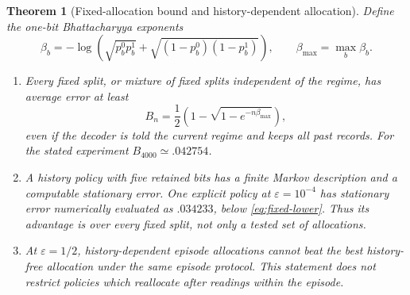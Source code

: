 \documentclass[12pt,a4paper]{article}
\newtheorem{theorem}{Theorem}[section]
\begin{document}
\begin{theorem}[Fixed-allocation bound and history-dependent allocation]
\label{thm:history-allocation}
Define the one-bit Bhattacharyya exponents
\[
 \beta_b=-\log\left(\sqrt{p_b^0p_b^1}
                  +\sqrt{(1-p_b^0)(1-p_b^1)}\right),\qquad
 \beta_{\max}=\max_b\beta_b.
\]
\begin{enumerate}
\item Every fixed split, or mixture of fixed splits independent of
the regime, has average error at least
\begin{equation}\label{eq:fixed-lower}
 B_n=\frac12\left(1-\sqrt{1-e^{-n\beta_{\max}}}\right),
\end{equation}
even if the decoder is told the current regime and keeps all past
records. For the stated experiment $B_{4000}\simeq .042754$.
\item A history policy with five retained bits has a finite Markov
description and a computable stationary error. One explicit policy
at $\varepsilon=10^{-4}$ has stationary error numerically evaluated
as $.034233$, below
\eqref{eq:fixed-lower}. Thus its advantage is over every fixed split,
not only a tested set of allocations.
\item At $\varepsilon=1/2$, history-dependent episode allocations
cannot beat the best history-free allocation under the same episode
protocol. This statement does not restrict policies which reallocate
after readings within the episode.
\end{enumerate}
\end{theorem}
\end{document}
